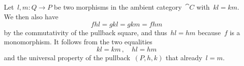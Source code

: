 \subsection{}

Let~$l, m \colon Q \to P$ be two morphisms in the ambient category~$\cat{C}$ with~$k l = k m$.
We then also have
\[
	f h l = g k l = g k m = f h m
\]
by the commutativity of the pullback square, and thus~$h l = h m$ because~$f$ is a monomorphism.
It follows from the two equalities
\[
	k l = k m \,,
	\quad
	h l = h m
\]
and the universal property of the pullback~$(P, h, k)$ that already~$l = m$.
